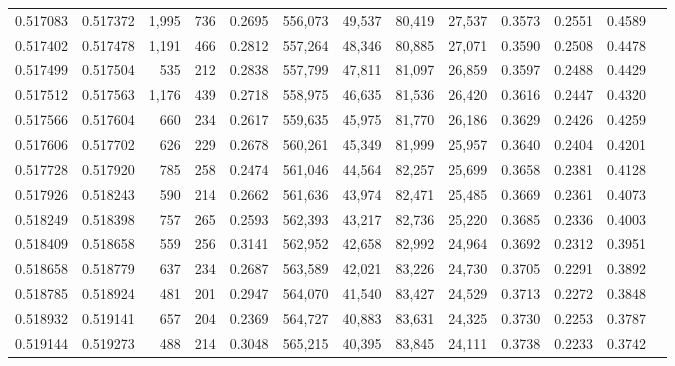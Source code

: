 \begin{tabular}{rrrrrrrrrrrrr}
0.517083 & 0.517372 & 1,995 &   736 &                                     0.2695 & 556,073 &  49,537 &  80,419 &  27,537 & 0.3573 & 0.2551 & 0.4589 \\
0.517402 & 0.517478 & 1,191 &   466 &                                     0.2812 & 557,264 &  48,346 &  80,885 &  27,071 & 0.3590 & 0.2508 & 0.4478 \\
0.517499 & 0.517504 &   535 &   212 &                                     0.2838 & 557,799 &  47,811 &  81,097 &  26,859 & 0.3597 & 0.2488 & 0.4429 \\
0.517512 & 0.517563 & 1,176 &   439 &                                     0.2718 & 558,975 &  46,635 &  81,536 &  26,420 & 0.3616 & 0.2447 & 0.4320 \\
0.517566 & 0.517604 &   660 &   234 &                                     0.2617 & 559,635 &  45,975 &  81,770 &  26,186 & 0.3629 & 0.2426 & 0.4259 \\
0.517606 & 0.517702 &   626 &   229 &                                     0.2678 & 560,261 &  45,349 &  81,999 &  25,957 & 0.3640 & 0.2404 & 0.4201 \\
0.517728 & 0.517920 &   785 &   258 &                                     0.2474 & 561,046 &  44,564 &  82,257 &  25,699 & 0.3658 & 0.2381 & 0.4128 \\
0.517926 & 0.518243 &   590 &   214 &                                     0.2662 & 561,636 &  43,974 &  82,471 &  25,485 & 0.3669 & 0.2361 & 0.4073 \\
0.518249 & 0.518398 &   757 &   265 &                                     0.2593 & 562,393 &  43,217 &  82,736 &  25,220 & 0.3685 & 0.2336 & 0.4003 \\
0.518409 & 0.518658 &   559 &   256 &                                     0.3141 & 562,952 &  42,658 &  82,992 &  24,964 & 0.3692 & 0.2312 & 0.3951 \\
0.518658 & 0.518779 &   637 &   234 &                                     0.2687 & 563,589 &  42,021 &  83,226 &  24,730 & 0.3705 & 0.2291 & 0.3892 \\
0.518785 & 0.518924 &   481 &   201 &                                     0.2947 & 564,070 &  41,540 &  83,427 &  24,529 & 0.3713 & 0.2272 & 0.3848 \\
0.518932 & 0.519141 &   657 &   204 &                                     0.2369 & 564,727 &  40,883 &  83,631 &  24,325 & 0.3730 & 0.2253 & 0.3787 \\
0.519144 & 0.519273 &   488 &   214 &                                     0.3048 & 565,215 &  40,395 &  83,845 &  24,111 & 0.3738 & 0.2233 & 0.3742 \\

\end{tabular}

